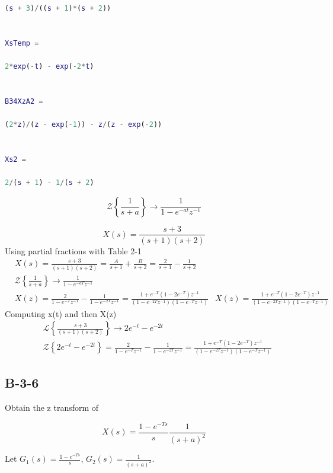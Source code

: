 {\begin{lstlisting}[language=Matlab,caption=Matlab Code for B-2-17]
(s + 3)/((s + 1)*(s + 2))
 
 
XsTemp =
 
2*exp(-t) - exp(-2*t)
 
 
B34XzA2 =
 
(2*z)/(z - exp(-1)) - z/(z - exp(-2))
 
 
Xs2 =
 
2/(s + 1) - 1/(s + 2)
\end{lstlisting}
    \begin{par}
$$\mathcal{Z} \left\{\frac{1}{s+a} \right\} \rightarrow \frac{1}{1-e^{-at}z^{-1}} $$
\end{par} \vspace{1em}

\[
X(s)= \frac{s+3}{(s+1)(s+2)}
\]
Using partial fractions with Table 2-1
	\begin{align*}
	& X(s) = \frac{s+3}{(s+1)(s+2)}= \frac{A}{s+1}+\frac{B}{s+2} = \frac{2}{s+1}-\frac{1}{s+2} \\
	& \mathcal{Z} \left\{\frac{1}{s+a}\right\} \rightarrow \frac{1}{1-e^{-aT}z^{-1}} \\
	& X(z) = \frac{2}{1-e^{-T}z^{-1}} - \frac{1}{1-e^{-2T}z^{-1}} = 
	\frac{1+e^{-T}(1-2e^{-T})z^{-1}}{(1-e^{-2T}z^{-1})(1-e^{-T}z^{-1})}
	& X(z) = \frac{1+e^{-T}(1-2e^{-T})z^{-1}}{(1-e^{-2T}z^{-1})(1-e^{-T}z^{-1})}
	\end{align*}
Computing x(t) and then X(z)
	\begin{align*}
	& \mathcal{L} \left\{ \frac{s+3}{(s+1)(s+2)}\right\} \rightarrow 2e^{-t}-e^{-2t}\\
	& \mathcal{Z} \left\{2e^{-t}-e^{-2t}\right\}= \frac{2}{1-e^{-T}z^{-1}}-\frac{1}{1-e^{-2T}z^{-1}}=\frac{1+e^{-T}(1-2e^{-T})z^{-1}}{(1-e^{-2T}z^{-1})(1-e^{-T}z^{-1})}
	\end{align*}
\subsection*{B-3-6}



        \begin{par}
Obtain the z transform of
\end{par} \vspace{1em}
\begin{par}
$$X(s)=\frac{1-e^{-Ts}}{s}\frac{1}{(s+a)^2}$$
\end{par} %

Let $G_1(s) = \frac{1-e^{-Ts}}{s}$, $G_2(s)=\frac{1}{(s+a)^2}$.

}
